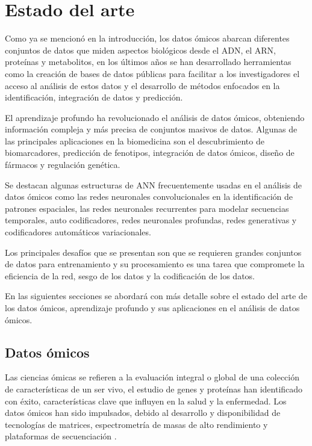 \section{Estado del arte}


Como ya se mencionó en la introducción, los datos ómicos abarcan diferentes conjuntos de datos que miden aspectos biológicos desde el ADN, el ARN, proteínas y metabolitos, en los últimos años se han desarrollado herramientas como la creación de bases de datos públicas para facilitar a los investigadores el acceso al análisis de estos datos y el desarrollo de métodos enfocados en la identificación, integración de datos y predicción.

El aprendizaje profundo ha revolucionado el análisis de datos ómicos, obteniendo información compleja y más precisa de conjuntos masivos de datos. Algunas de las principales aplicaciones en la biomedicina son el descubrimiento de biomarcadores, predicción de fenotipos, integración de datos ómicos, diseño de fármacos y regulación genética.

Se destacan algunas estructuras de ANN frecuentemente usadas en el análisis de datos ómicos como las redes neuronales convolucionales en la identificación de patrones espaciales, las redes neuronales recurrentes para modelar secuencias temporales, auto codificadores, redes neuronales profundas, redes generativas y codificadores automáticos variacionales.

Los principales desafíos que se presentan son que se requieren grandes conjuntos de datos para entrenamiento y su procesamiento es una tarea que compromete la eficiencia de la red, sesgo de los datos y la codificación de los datos.

En las siguientes secciones se abordará con más detalle sobre el estado del arte de los datos ómicos, aprendizaje profundo y sus aplicaciones en el análisis de datos ómicos.

\subsection{Datos ómicos}

Las ciencias ómicas se refieren a la evaluación integral o global de una colección de características de un ser vivo, el estudio de genes y proteínas han identificado con éxito, características clave que influyen en la salud y la enfermedad. Los datos ómicos han sido impulsados, debido al desarrollo y disponibilidad de tecnologías de matrices, espectrometría de masas de alto rendimiento y plataformas de secuenciación \citep{hasin2017multi}.

